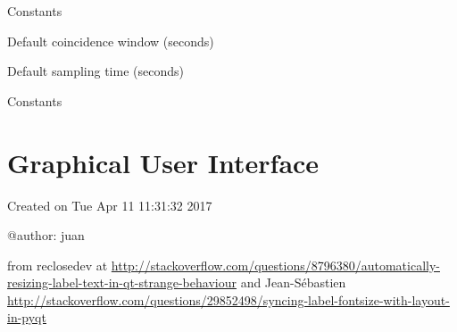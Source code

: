 \documentclass[letterpaper,10pt,english]{sphinxmanual}
\begin{document}

\begin{fulllineitems}
\label{\detokenize{code:reimaginedQuantum.Experiment}}
Constants

\begin{fulllineitems}
\label{\detokenize{code:reimaginedQuantum.Experiment.BASE_COINWIN}}
Default coincidence window (seconds)

\end{fulllineitems}


\begin{fulllineitems}
\label{\detokenize{code:reimaginedQuantum.Experiment.BASE_SAMPLING}}
Default sampling time (seconds)

\end{fulllineitems}


\end{fulllineitems}


\begin{fulllineitems}
\label{\detokenize{code:reimaginedQuantum.TimerChannel}}
Constants

\end{fulllineitems}



\section{Graphical User Interface}
\label{\detokenize{code:graphical-user-interface}}\label{\detokenize{code:module-mainGUI}}
Created on Tue Apr 11 11:31:32 2017

@author: juan

\begin{fulllineitems}
\label{\detokenize{code:mainGUI.AutoSizeLabel}}
from reclosedev at \url{http://stackoverflow.com/questions/8796380/automatically-resizing-label-text-in-qt-strange-behaviour}
and Jean-Sébastien \url{http://stackoverflow.com/questions/29852498/syncing-label-fontsize-with-layout-in-pyqt}

\end{fulllineitems}
\end{document}
